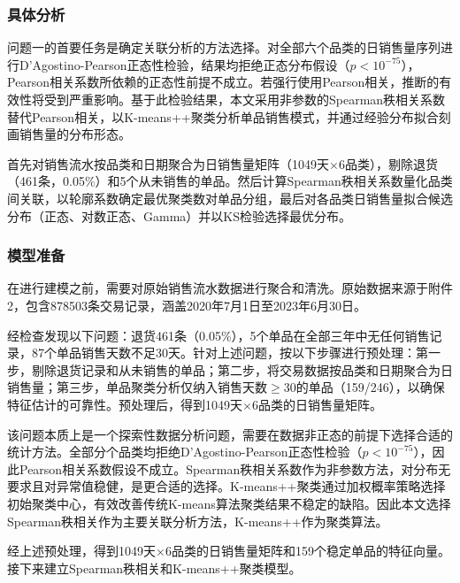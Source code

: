 
\subsubsection{具体分析}

问题一的首要任务是确定关联分析的方法选择。对全部六个品类的日销售量序列进行D'Agostino-Pearson正态性检验，结果均拒绝正态分布假设（$p < 10^{-75}$），Pearson相关系数所依赖的正态性前提不成立。若强行使用Pearson相关，推断的有效性将受到严重影响。基于此检验结果，本文采用非参数的Spearman秩相关系数替代Pearson相关，以K-means++聚类分析单品销售模式，并通过经验分布拟合刻画销售量的分布形态。

首先对销售流水按品类和日期聚合为日销售量矩阵（1049天$\times$6品类），剔除退货（461条，0.05\%）和5个从未销售的单品。然后计算Spearman秩相关系数量化品类间关联，以轮廓系数确定最优聚类数对单品分组，最后对各品类日销售量拟合候选分布（正态、对数正态、Gamma）并以KS检验选择最优分布。

\subsubsection{模型准备}

在进行建模之前，需要对原始销售流水数据进行聚合和清洗。原始数据来源于附件2，包含878503条交易记录，涵盖2020年7月1日至2023年6月30日。

经检查发现以下问题：退货461条（0.05\%），5个单品在全部三年中无任何销售记录，87个单品销售天数不足30天。针对上述问题，按以下步骤进行预处理：第一步，剔除退货记录和从未销售的单品；第二步，将交易数据按品类和日期聚合为日销售量；第三步，单品聚类分析仅纳入销售天数$\geq 30$的单品（159/246），以确保特征估计的可靠性。预处理后，得到1049天$\times$6品类的日销售量矩阵。

该问题本质上是一个探索性数据分析问题，需要在数据非正态的前提下选择合适的统计方法。全部分个品类均拒绝D'Agostino-Pearson正态性检验（$p < 10^{-75}$），因此Pearson相关系数假设不成立。Spearman秩相关系数作为非参数方法，对分布无要求且对异常值稳健，是更合适的选择。K-means++聚类通过加权概率策略选择初始聚类中心\cite{Arthur2007}，有效改善传统K-means算法聚类结果不稳定的缺陷。因此本文选择Spearman秩相关作为主要关联分析方法，K-means++作为聚类算法。

经上述预处理，得到1049天×6品类的日销售量矩阵和159个稳定单品的特征向量。接下来建立Spearman秩相关和K-means++聚类模型。
